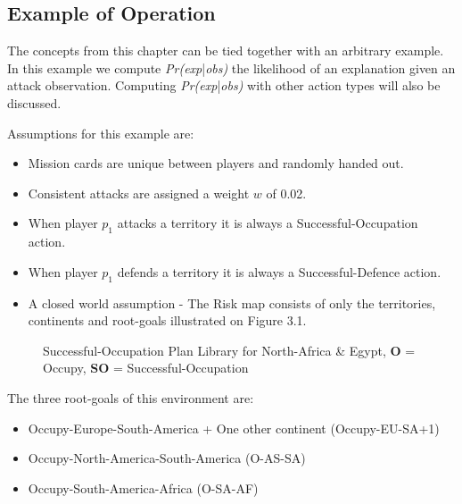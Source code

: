 \documentclass[parskip]{cs4rep}
\begin{document}
\subsection{Example of Operation}

The concepts from this chapter can be tied together with an arbitrary example. In this example we compute \textit{Pr(exp}|\textit{obs)} the likelihood of an explanation given an attack observation. Computing \textit{Pr(exp}|\textit{obs)} with other action types will also be discussed.

Assumptions for this example are:

\begin{itemize}
\item
Mission cards are unique between players and randomly handed out.
\item
Consistent attacks are assigned a weight $w$ of 0.02.
\item
When player $p_1$ attacks a territory it is always a Successful-Occupation action.
\item
When player $p_1$ defends a territory it is always a Successful-Defence action.
\item
A closed world assumption - The Risk map consists of only the territories, continents and root-goals illustrated on Figure 3.1.
\end{itemize}

\begin{figure}[h]
\caption{Successful-Occupation Plan Library for North-Africa \& Egypt, \textbf{O} = Occupy, \textbf{SO} = Successful-Occupation}
\end{figure}

\newpage

The three root-goals of this environment are:

\begin{itemize}
\item
Occupy-Europe-South-America + One other continent (Occupy-EU-SA+1)
\item
Occupy-North-America-South-America (O-AS-SA)
\item
Occupy-South-America-Africa (O-SA-AF)
\end{itemize}
\end{document}

